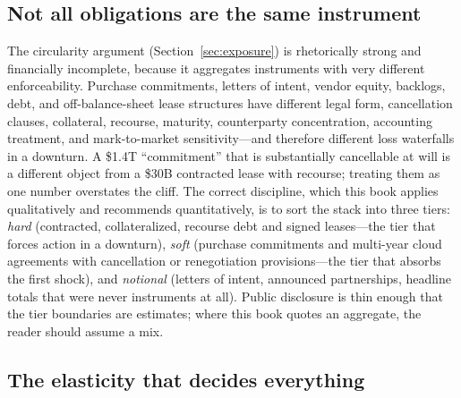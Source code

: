 \subsection{Not all obligations are the same instrument}

The circularity argument (Section~\ref{sec:exposure}) is rhetorically strong and financially incomplete, because it aggregates instruments with very different enforceability. Purchase commitments, letters of intent, vendor equity, backlogs, debt, and off-balance-sheet lease structures have different legal form, cancellation clauses, collateral, recourse, maturity, counterparty concentration, accounting treatment, and mark-to-market sensitivity---and therefore different loss waterfalls in a downturn. A \$1.4T ``commitment'' that is substantially cancellable at will is a different object from a \$30B contracted lease with recourse; treating them as one number overstates the cliff. The correct discipline, which this book applies qualitatively and recommends quantitatively, is to sort the stack into three tiers: \emph{hard} (contracted, collateralized, recourse debt and signed leases---the tier that forces action in a downturn), \emph{soft} (purchase commitments and multi-year cloud agreements with cancellation or renegotiation provisions---the tier that absorbs the first shock), and \emph{notional} (letters of intent, announced partnerships, headline totals that were never instruments at all). Public disclosure is thin enough that the tier boundaries are estimates; where this book quotes an aggregate, the reader should assume a mix.

\subsection{The elasticity that decides everything}


